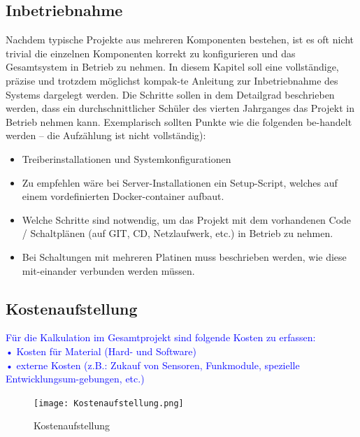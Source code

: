 \subsection{Inbetriebnahme}
\color{blue}
Nachdem typische Projekte aus mehreren Komponenten bestehen, ist es oft nicht trivial die einzelnen Komponenten korrekt zu konfigurieren und das Gesamtsystem in Betrieb zu nehmen. In diesem Kapitel soll eine vollständige, präzise und trotzdem möglichst kompak-te Anleitung zur Inbetriebnahme des Systems dargelegt werden. Die Schritte sollen in dem Detailgrad beschrieben werden, dass ein durchschnittlicher Schüler des vierten Jahrganges das Projekt in Betrieb nehmen kann. Exemplarisch sollten Punkte wie die folgenden be-handelt werden – die Aufzählung ist nicht vollständig):
\begin{itemize}
    \item Treiberinstallationen und Systemkonfigurationen
    \item Zu empfehlen wäre bei Server-Installationen ein Setup-Script, welches auf einem vordefinierten Docker-container aufbaut.
    \item Welche Schritte sind notwendig, um das Projekt mit dem vorhandenen Code / Schaltplänen (auf GIT, CD, Netzlaufwerk, etc.) in Betrieb zu nehmen.
    \item Bei Schaltungen mit mehreren Platinen muss beschrieben werden, wie diese mit-einander verbunden werden müssen.
\end{itemize}
\color{black}

\newpage
\subsection{Kostenaufstellung}
\textcolor{blue}{Für die Kalkulation im Gesamtprojekt sind folgende Kosten zu erfassen: \\
•	Kosten für Material (Hard- und Software)\\
•	externe Kosten (z.B.: Zukauf von Sensoren, Funkmodule, spezielle Entwicklungsum-gebungen, etc.) 
}
\begin{figure}[h]
    \texttt{[image: Kostenaufstellung.png]}
    \centering
    \caption{Kostenaufstellung}
\end{figure}

\newpage
